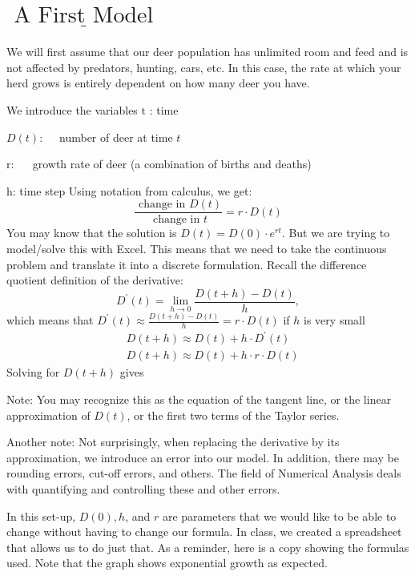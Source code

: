 \documentclass[10pt]{article}
\begin{document}
\section{$\underline{\text { A First Model }}$}
We will first assume that our deer population has unlimited room and feed and is not affected by predators, hunting, cars, etc. In this case, the rate at which your herd grows is entirely dependent on how many deer you have.

We introduce the variables $\mathrm{t}$ : time

$D(t): \quad$ number of deer at time $t$

r: $\quad$ growth rate of deer (a combination of births and deaths)

h: time step Using notation from calculus, we get:
$$
\frac{\text { change in } D(t)}{\text { change in } t}=r \cdot D(t)
$$
You may know that the solution is $D(t)=D(0) \cdot e^{r t}$. But we are trying to model/solve this with Excel. This means that we need to take the continuous problem and translate it into a discrete formulation. Recall the difference quotient definition of the derivative:
$$
D^{\prime}(t)=\lim _{h \rightarrow 0} \frac{D(t+h)-D(t)}{h},
$$
which means that $D^{\prime}(t) \approx \frac{D(t+h)-D(t)}{h}=r \cdot D(t)$ if $h$ is very small
$$
\begin{aligned}
&D(t+h) \approx D(t)+h \cdot D^{\prime}(t) \\
&D(t+h) \approx D(t)+h \cdot r \cdot D(t)
\end{aligned}
$$
Solving for $D(t+h)$ gives

Note: You may recognize this as the equation of the tangent line, or the linear approximation of $D(t)$, or the first two terms of the Taylor series.

Another note: Not surprisingly, when replacing the derivative by its approximation, we introduce an error into our model. In addition, there may be rounding errors, cut-off errors, and others. The field of Numerical Analysis deals with quantifying and controlling these and other errors.

In this set-up, $D(0), h$, and $r$ are parameters that we would like to be able to change without having to change our formula. In class, we created a spreadsheet that allows us to do just that. As a reminder, here is a copy showing the formulas used. Note that the graph shows exponential growth as expected.
\end{document}
